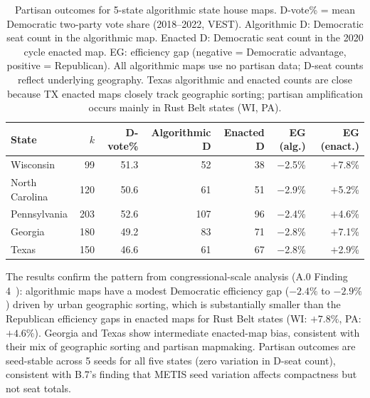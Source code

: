 \begin{table}[h]
\centering\small
\begin{tabular}{lrrrrrr}
\toprule
State & $k$ & D-vote\% & Algorithmic D & Enacted D & EG (alg.) & EG (enact.) \\
\midrule
Wisconsin   &  99 & 51.3 & 52 & 38 & $-$2.5\% & $+$7.8\% \\
North Carolina & 120 & 50.6 & 61 & 51 & $-$2.9\% & $+$5.2\% \\
Pennsylvania & 203 & 52.6 & 107 & 96 & $-$2.4\% & $+$4.6\% \\
Georgia     & 180 & 49.2 & 83 & 71 & $-$2.8\% & $+$7.1\% \\
Texas       & 150 & 46.6 & 61 & 67 & $-$2.8\% & $+$2.9\% \\
\bottomrule
\end{tabular}
\caption{Partisan outcomes for 5-state algorithmic state house maps.
  D-vote\% = mean Democratic two-party vote share (2018--2022, VEST).
  Algorithmic D: Democratic seat count in the algorithmic map.
  Enacted D: Democratic seat count in the 2020 cycle enacted map.
  EG: efficiency gap (negative = Democratic advantage, positive = Republican).
  All algorithmic maps use no partisan data; D-seat counts reflect underlying
  geography. Texas algorithmic and enacted counts are close because TX enacted
  maps closely track geographic sorting; partisan amplification occurs mainly
  in Rust Belt states (WI, PA).}
\label{tab:partisan-5state}
\end{table}

The results confirm the pattern from congressional-scale analysis
(A.0 Finding 4~\citep{dellaLibera2026a0}): algorithmic maps have
a modest Democratic efficiency gap ($-2.4\%$ to $-2.9\%$) driven by urban
geographic sorting, which is substantially smaller than the Republican
efficiency gaps in enacted maps for Rust Belt states (WI: $+7.8\%$,
PA: $+4.6\%$). Georgia and Texas show intermediate enacted-map bias,
consistent with their mix of geographic sorting and partisan mapmaking.
Partisan outcomes are seed-stable across 5 seeds for all five states
(zero variation in D-seat count), consistent with B.7's finding that
METIS seed variation affects compactness but not seat totals.
